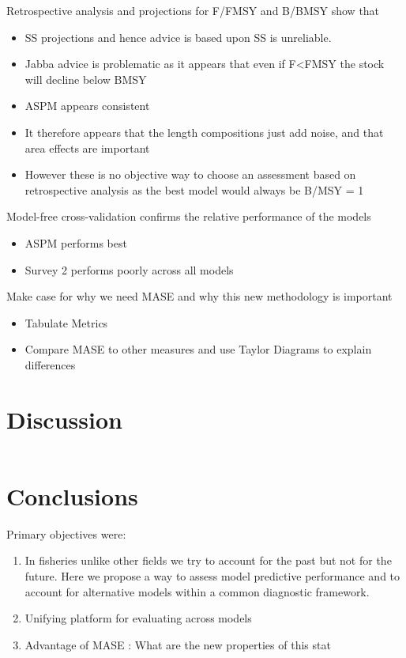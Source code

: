 \documentclass[a4paper]{article}
\begin{document}
\begin{description}
    \item{Retrospective analysis and projections for F/FMSY and B/BMSY} show that
    \begin{itemize}
        \item SS projections and hence advice is based upon SS is unreliable.
        \item Jabba advice is problematic as it appears that even if F<FMSY the stock will decline below BMSY
        \item ASPM appears consistent
        \item It therefore appears that the length compositions just add noise, and that area effects are important
        \item However these is no objective way to choose an assessment based on retrospective analysis as the best model would always be B/MSY = 1 
        \end{itemize}
    \item{Model-free cross-validation} confirms the relative performance of the models
    \begin{itemize}
        \item ASPM performs best
        \item Survey 2 performs poorly across all models
   \end{itemize}
   \item{Make case for why we need MASE and why this new methodology is important}
    \begin{itemize}
        \item Tabulate Metrics
        \item Compare MASE to other measures and use Taylor Diagrams to explain differences
   \end{itemize}

\end{description}

\section{Discussion}

\begin{verbatim}\end{verbatim}
\section{Conclusions}


Primary objectives were:
\begin{enumerate}
    \item In fisheries unlike other fields we try to account for the past but not for the future. Here we propose a way to assess model predictive performance and to account for alternative models within a common diagnostic framework.  
    \item Unifying platform for evaluating across models
    \item Advantage of MASE : What are the new properties of this stat
\end{enumerate}
\end{document}
